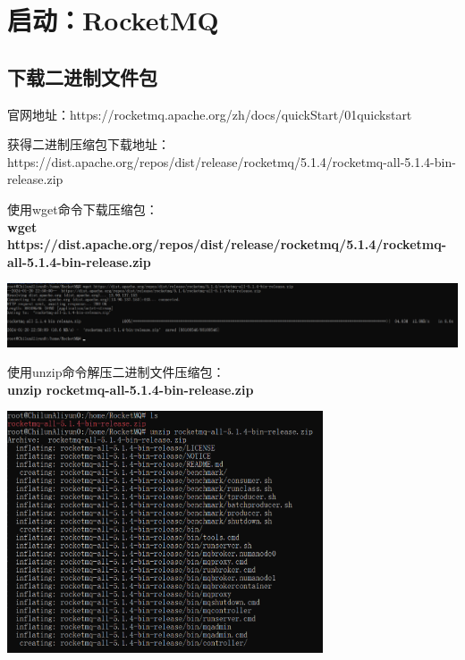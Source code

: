 \documentclass[11pt, a4paper, oneside, fontset=none]{ctexbook}
\begin{document}
\chapter{启动：RocketMQ}
\section{下载二进制文件包}
官网地址：https://rocketmq.apache.org/zh/docs/quickStart/01quickstart

获得二进制压缩包下载地址：\\https://dist.apache.org/repos/dist/release/rocketmq/5.1.4/rocketmq-all-5.1.4-bin-release.zip

使用wget命令下载压缩包：\\{\bfseries\kaishu wget https://dist.apache.org/repos/dist/release/rocketmq/5.1.4/rocketmq-all-5.1.4-bin-release.zip}
\begin{center}
  \begin{minipage}{\textwidth}
    \center
    \includegraphics[width=\textwidth]{picture/下载二进制文件.png}
    \captionsetup{hypcap=false}
    \label{fig:下载二进制压缩包}
  \end{minipage}
\end{center}

使用unzip命令解压二进制文件压缩包：\\{\bfseries\kaishu unzip rocketmq-all-5.1.4-bin-release.zip}
\begin{center}
  \begin{minipage}{\textwidth}
    \center
    \includegraphics[width=0.7\textwidth]{picture/解压二进制文件.png}
    \captionsetup{hypcap=false}
    \label{fig:解压二进制文件}
  \end{minipage}
\end{center}
\end{document}
